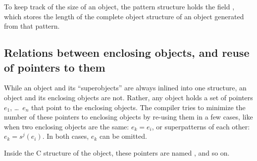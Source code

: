 To keep track of the size of an object, the pattern structure
holds the field , which stores the length of the
complete object structure of an object generated from that
pattern.

\subsection{Relations between enclosing objects, and reuse of pointers
    to them}
While an object and its ``superobjects'' are always inlined into
one structure, an object and its enclosing objects are not.
Rather, any object holds a set of pointers $e_1$, \ldots\ $e_n$
that point to the enclosing objects.  The compiler tries to
minimize the number of these pointers to enclosing objects
by re-using them in a few cases, like when two enclosing
objects are the same: $e_k = e_i$, or superpatterns of each
other: $e_k = s^j(e_i)$.  In both cases, $e_k$ can be omitted.

Inside the C structure of the object, these pointers are
named ,  and so on.

